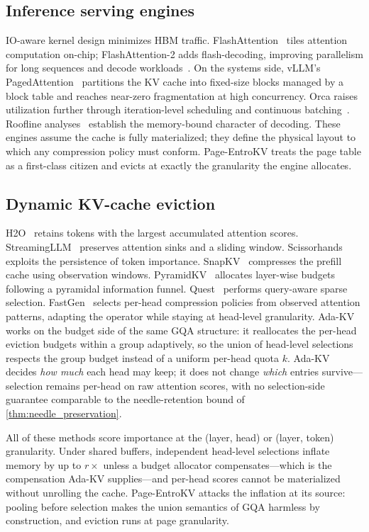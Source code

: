 \documentclass[final,5p,times,twocolumn]{elsarticle}
\theoremstyle{definition}
\theoremstyle{remark}
\newcommand{\method}{Page-EntroKV}
\begin{document}
\subsection{Inference serving engines}
IO-aware kernel design minimizes HBM traffic.
FlashAttention~\cite{dao2022flashattention} tiles attention computation
on-chip; FlashAttention-2 adds flash-decoding, improving parallelism for
long sequences and decode workloads~\cite{dao2023flashattention2}. On
the systems side, vLLM's PagedAttention~\cite{kwon2023vllm} partitions
the KV cache into fixed-size blocks managed by a block table and reaches
near-zero fragmentation at high concurrency. Orca raises utilization
further through iteration-level scheduling and continuous
batching~\cite{yu2022orca}. Roofline analyses~\cite{pope2022scaling}
establish the memory-bound character of decoding. These engines assume
the cache is fully materialized; they define the physical layout to
which any compression policy must conform. \method{} treats the page
table as a first-class citizen and evicts at exactly the granularity the
engine allocates.

\subsection{Dynamic KV-cache eviction}
H2O~\cite{zhang2023h2o} retains tokens with the largest accumulated
attention scores. StreamingLLM~\cite{xiao2024streamingllm} preserves
attention sinks and a sliding window.
Scissorhands~\cite{liu2023scissorhands} exploits the persistence of
token importance. SnapKV~\cite{li2024snapkv} compresses the prefill cache
using observation windows. PyramidKV~\cite{cai2024pyramidkv} allocates
layer-wise budgets following a pyramidal information funnel.
Quest~\cite{tang2024quest} performs query-aware sparse selection.
FastGen~\cite{ge2024fastgen} selects per-head compression policies from
observed attention patterns, adapting the operator while staying at
head-level granularity. Ada-KV~\cite{feng2024adakv} works on the budget
side of the same GQA structure: it reallocates the per-head eviction
budgets within a group adaptively, so the union of head-level selections
respects the group budget instead of a uniform per-head quota $k$.
Ada-KV decides \emph{how much} each head may keep; it does not change
\emph{which} entries survive---selection remains per-head on raw
attention scores, with no selection-side guarantee comparable to the
needle-retention bound of \cref{thm:needle_preservation}.

All of these methods score importance at the (layer, head) or (layer,
token) granularity. Under shared buffers, independent head-level
selections inflate memory by up to $r\times$ unless a budget allocator
compensates---which is the compensation Ada-KV supplies---and per-head
scores cannot be materialized without unrolling the cache. \method{}
attacks the inflation at its source: pooling before selection makes the
union semantics of GQA harmless by construction, and eviction runs at
page granularity.
\end{document}

